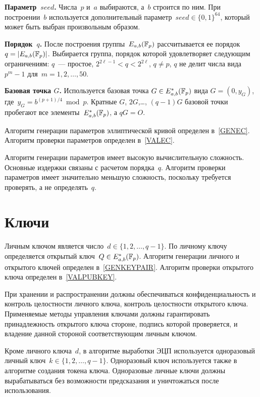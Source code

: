 {\bf Параметр~$seed$.} 
Числа~$p$ и~$a$ выбираются, а~$b$ строится по ним.
При построении~$b$ используется дополнительный
параметр~$seed\in\{0,1\}^{64}$,
который может быть выбран произвольным образом.

{\bf Порядок~$q$.}
После построения группы~$E_{a,b}(\mathbb{F}_p)$ рассчитывается 
ее порядок~$q=|E_{a,b}(\mathbb{F}_p)|$.
%
Выбирается группа, порядок которой удовлетворяет следующим ограничениям:
$q$~--- простое,
$2^{2\ell-1}<q<2^{2\ell}$,
$q\neq p$,
$q$ не делит числа вида $p^m-1$ для~$m=1,2,\ldots,50$.

{\bf Базовая точка $G$.}
Используется базовая
точка $G\in E_{a,b}^*(\mathbb{F}_p)$ вида $G=(0,y_G)$,
где~$y_G=b^{(p+1)/4}\bmod{p}$.
%
Кратные $G$, $2G$,\ldots, $(q-1)G$ базовой точки
пробегают все элементы~$E_{a,b}^*(\mathbb{F}_p)$, а $qG=O$.

Алгоритм генерации параметров эллиптической кривой определен в~\ref{GENEC}. 
Алгоритм проверки параметров определен в~\ref{VALEC}. 

\begin{note*}
Алгоритм генерации параметров имеет высокую вычислительную сложность. Основные
издержки связаны с расчетом порядка~$q$.
%
Алгоритм проверки параметров имеет значительно меньшую сложность, поскольку
требуется проверять, а не определять~$q$.
\end{note*}

\section{Ключи}\label{COMMON.Keys}

Личным ключом является число~$d\in\{1,2,\ldots,q-1\}$.
По личному ключу определяется открытый ключ~$Q\in E_{a,b}^*(\mathbb{F}_p)$.
Алгоритм генерации личного и открытого ключей определен в~\ref{GENKEYPAIR}.
Алгоритм проверки открытого ключа определен в~\ref{VALPUBKEY}.

При хранении и распространении
должны обеспечиваться конфиденциальность и контроль целостности личного 
ключа, контроль целостности открытого ключа.
%
Применяемые методы управления ключами должны 
гарантировать принадлежность открытого ключа стороне, 
подпись которой проверяется, и владение данной стороной 
соответствующим личным ключом.

Кроме личного ключа~$d$, в алгоритме выработки ЭЦП 
используется одноразовый личный ключ~$k\in\{1,2,\ldots,q-1\}$.
Одноразовый ключ используется также в алгоритме создания токена ключа.
Одноразовые личные ключи должны вырабатываться без возможности 
предсказания и уничтожаться после использования.

